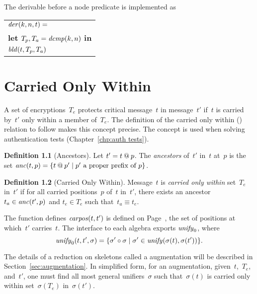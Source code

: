 \documentclass[12pt]{report}
\theoremstyle{definition}
\newtheorem{defn}{Definition}[chapter]
\begin{document}
The derivable before a node predicate is implemented as
\begin{center}
\begin{tabular}{l}
$\operatorname{\mathit{der}}(k,n,t)={}$\\
\quad\textbf{let} $T_p, T_a=\operatorname{\mathit{dcmp}}(k,n)$ \textbf{in}\\
\quad$\operatorname{\mathit{bld}}(t,T_p,T_a)$
\end{tabular}
\end{center}

\chapter{Carried Only Within}\label{chp:cow}

A set of encryptions~$T_e$ protects critical message~$t$ in
message~$t'$ if~$t$ is carried by~$t'$ only within a member of~$T_e$.
The definition of the carried only within ({\cow}) relation to follow makes
this concept precise.  The concept is used when solving authentication
tests (Chapter~\ref{chp:auth tests}).

\begin{defn}[Ancestors]
Let $t'=t\mathbin{@} p$.  The \emph{ancestors} of~$t'$
in~$t$ at~$p$ is the set $\operatorname{\mathit{anc}}(t,p)=\{t\mathbin{@} p'\mid \mbox{$p'$ a
  proper prefix of~$p$}\}$.
\end{defn}

\begin{defn}[Carried Only Within]\label{def:cow}
Message~$t$ is \emph{carried only within}
set~$T_e$ in~$t'$ if for all carried
positions~$p$ of~$t$ in~$t'$, there exists an
ancestor~$t_a\in\operatorname{\mathit{anc}}(t',p)$ and $t_e\in T_e$ such that~$t_a\equiv
t_e$.
\end{defn}

The function defines $\operatorname{\mathit{carpos}}(t,t')$ is defined on
Page~\pageref{def:carried positions}, the set of positions at
which~$t'$ carries~$t$.  The interface to each algebra exports
$\operatorname{\mathit{unify}}_0$, where
$$\operatorname{\mathit{unify}}_0(t,t',\sigma)=\{\sigma'\circ\sigma\mid
\sigma'\in\operatorname{\mathit{unify}}(\sigma(t),\sigma(t'))\}.$$

The details of a reduction on skeletons called a augmentation will be
described in Section~\ref{sec:augmentation}.  In simplified form, for
an augmentation, given~$t$,~$T_e$, and~$t'$, one must find all most
general unifiers~$\sigma$ such that~$\sigma(t)$ is carried only within
set~$\sigma(T_e)$ in~$\sigma(t')$.
\end{document}
